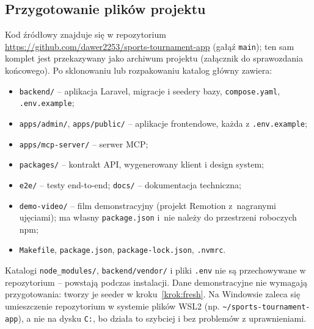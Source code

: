 \documentclass[11pt,a4paper,oneside]{article}
\newif\ifpodpowiedzi
\newcommand{\podpowiedz}[1]{\ifpodpowiedzi\par\begingroup\small\color{hintcolor}\textit{Wskazówka: #1}\par\endgroup\fi}
\begin{document}
\subsection{Przygotowanie plików projektu}
\podpowiedz{Wskaż przekazany pakiet i jego strukturę: kod źródłowy, pliki projektu, zasoby, dane, instalatory lub obrazy kontenerów. Dla projektu programistycznego podaj adres repozytorium oraz identyfikator commitu lub tagu odpowiadającego przekazanemu pakietowi. Dla projektu o innym charakterze wskaż uzgodnione miejsce przechowywania materiałów i oznaczenie wersji plików. Instrukcja powinna umożliwiać pracę z zarchiwizowanym kompletem materiałów; sam odnośnik do repozytorium lub zewnętrznej usługi nie zastępuje przekazania wymaganych plików. Opisz rozpakowanie, rozmieszczenie plików i wymagane przygotowanie danych.}
Kod źródłowy znajduje się w repozytorium \url{https://github.com/dawer2253/sports-tournament-app} (gałąź \texttt{main}); ten sam komplet jest przekazywany jako archiwum projektu (załącznik do sprawozdania końcowego). Po sklonowaniu lub rozpakowaniu katalog główny zawiera:
\begin{itemize}
\item \texttt{backend/} -- aplikacja Laravel, migracje i seedery bazy, \texttt{compose.yaml}, \texttt{.env.example};
\item \texttt{apps/admin/}, \texttt{apps/public/} -- aplikacje frontendowe, każda z \texttt{.env.example};
\item \texttt{apps/mcp-server/} -- serwer MCP;
\item \texttt{packages/} -- kontrakt API, wygenerowany klient i design system;
\item \texttt{e2e/} -- testy end-to-end; \texttt{docs/} -- dokumentacja techniczna;
\item \texttt{demo-video/} -- film demonstracyjny (projekt Remotion z~nagranymi ujęciami); ma własny \texttt{package.json} i~nie należy do przestrzeni roboczych npm;
\item \texttt{Makefile}, \texttt{package.json}, \texttt{package-lock.json}, \texttt{.nvmrc}.
\end{itemize}
Katalogi \texttt{node\_modules/}, \texttt{backend/vendor/} i pliki \texttt{.env} nie są przechowywane w repozytorium -- powstają podczas instalacji. Dane demonstracyjne nie wymagają przygotowania: tworzy je seeder w kroku~\ref{krok:fresh}. Na Windowsie zaleca się umieszczenie repozytorium w systemie plików WSL2 (np. \texttt{\textasciitilde/sports-tournament-app}), a nie na dysku \texttt{C:}, bo działa to szybciej i bez problemów z uprawnieniami.
\end{document}
